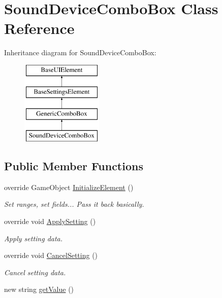 \hypertarget{class_sound_device_combo_box}{}\section{Sound\+Device\+Combo\+Box Class Reference}
\label{class_sound_device_combo_box}
Inheritance diagram for Sound\+Device\+Combo\+Box\+:\begin{figure}[H]
\begin{center}
\leavevmode
\includegraphics[height=4.000000cm]{class_sound_device_combo_box}
\end{center}
\end{figure}
\subsection*{Public Member Functions}
\begin{DoxyCompactItemize}
\item 
override Game\+Object \hyperlink{class_sound_device_combo_box_a20c9540411ea0e9248b54f5a54725290}{Initialize\+Element} ()
\begin{DoxyCompactList}\small\item\em Set ranges, set fields... Pass it back basically. \end{DoxyCompactList}\item 
override void \hyperlink{class_sound_device_combo_box_a93dba6ff0e9ebd8767b9e15551231747}{Apply\+Setting} ()
\begin{DoxyCompactList}\small\item\em Apply setting data. \end{DoxyCompactList}\item 
override void \hyperlink{class_sound_device_combo_box_af557c68898898b0a6b490b72f56ff082}{Cancel\+Setting} ()
\begin{DoxyCompactList}\small\item\em Cancel setting data. \end{DoxyCompactList}\item 
new string \hyperlink{class_sound_device_combo_box_ac4569464e277f78b93663d39e116d06d}{get\+Value} ()
\end{DoxyCompactItemize}
